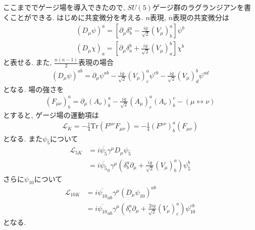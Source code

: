 ここまででゲージ場を導入できたので, $SU(5)$ゲージ群のラグランジアンを書くことができる.
はじめに共変微分を考える.
$n$表現, $\overline{n}$表現の共変微分は
\begin{align}
  (D_\mu \psi)^a = \left[\partial_\mu \delta^a_b - \frac{ig}{\sqrt{2}}(V_\mu)^a_b\right]\psi^b\nonumber\\
  (D_\mu \chi)_a = \left[\partial_\mu \delta^b_a + \frac{ig}{\sqrt{2}}(V_\mu)^b_a\right]\chi^b\nonumber
\end{align}
と表せる.
また, $\frac{n(n-1)}{2}$表現の場合
\begin{align}
  (D_\mu \psi)^{ab} = \partial_\mu \psi^{ab} - \frac{ig}{\sqrt{2}}(V_\mu)^a_c\psi^{cb}- \frac{ig}{\sqrt{2}}(V_\mu)^b_d\psi^{ad}\nonumber
\end{align}
となる.
場の強さを
\begin{align}
  (F_{\mu\nu})^a_b = \partial_\mu(A_\nu)^a_b -\frac{ig}{\sqrt{2}}(A_\mu)^a_c (A_\nu)^c_b - (\mu\leftrightarrow\nu)
\end{align}
とすると, ゲージ場の運動項は
\begin{align}
  \mathcal{L}_K = -\frac{1}{4}\mathrm{Tr}(F^{\mu\nu}F_{\mu\nu})=-\frac{1}{4}(F^{\mu\nu})^a_b(F_{\mu\nu})
\end{align}
となる.
また$\psi_{\overline{5}}$について
\begin{align}
  \mathcal{L}_{5K} &= i\overline{\psi_{\overline{5}}}\gamma^\mu D_\mu\psi_{\bar{5}}\nonumber\\
                   &= i\overline{\psi_{\overline{5}}}_a\gamma^\mu \left(\delta^a_b \partial_\mu + \frac{ig}{\sqrt{2}}(V_\mu)^a_b\right)\psi_{\bar{5}}^b\nonumber
\end{align}
さらに$\psi_{10}$について
\begin{align}
  \mathcal{L}_{10K} &= i\overline{\psi_{10}}_{ab}\gamma^\mu \left(D_\mu\psi_{10}\right)^{ab}\nonumber\\
                    &= i\overline{\psi_{10}}_{ab}\gamma^\mu \left(\delta^a_c \partial_\mu + \frac{2ig}{\sqrt{2}}(V_\mu)^a_c\right)\psi_{10}^{cb}\nonumber
\end{align}
となる.

